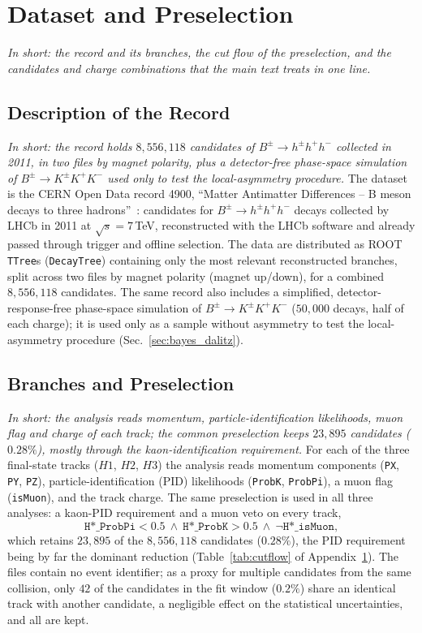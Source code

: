 \appendix
\makeatletter{}\makeatother
\makeatletter\renewcommand{}\makeatother
\section{Dataset and Preselection}
\label{app:ext_data}
\emph{In short: the record and its branches, the cut flow of the preselection, and the candidates and charge combinations that the main text treats in one line.}

\subsection{Description of the Record}
\emph{In short: the record holds $8{,}556{,}118$ candidates of $B^\pm\to h^\pm h^+h^-$ collected in 2011, in two files by magnet polarity, plus a detector-free phase-space simulation of $B^\pm\to K^\pm K^+K^-$ used only to test the local-asymmetry procedure.}
The dataset is the CERN Open Data record 4900, ``Matter Antimatter Differences -- B meson decays to three hadrons''~\cite{opendata_record}: candidates for $B^{\pm}\to h^{\pm}h^{+}h^{-}$ decays collected by LHCb in 2011 at $\sqrt{s}=7$\,TeV, reconstructed with the LHCb software and already passed through trigger and offline selection. The data are distributed as ROOT \texttt{TTree}s (\texttt{DecayTree}) containing only the most relevant reconstructed branches, split across two files by magnet polarity (magnet up/down), for a combined $8{,}556{,}118$ candidates. The same record also includes a simplified, detector-response-free phase-space simulation of $B^{\pm}\to K^{\pm}K^{+}K^{-}$ ($50{,}000$ decays, half of each charge); it is used only as a sample without asymmetry to test the local-asymmetry procedure (Sec.~\ref{sec:bayes_dalitz}).

\subsection{Branches and Preselection}
\emph{In short: the analysis reads momentum, particle-identification likelihoods, muon flag and charge of each track; the common preselection keeps $23{,}895$ candidates ($0.28\%$), mostly through the kaon-identification requirement.}
For each of the three final-state tracks ($H1$, $H2$, $H3$) the analysis reads momentum components (\texttt{PX}, \texttt{PY}, \texttt{PZ}), particle-identification (PID) likelihoods (\texttt{ProbK}, \texttt{ProbPi}), a muon flag (\texttt{isMuon}), and the track charge. The same preselection is used in all three analyses: a kaon-PID requirement and a muon veto on every track,
\[
\texttt{H*\_ProbPi} < 0.5 \ \wedge\ \texttt{H*\_ProbK} > 0.5 \ \wedge\ \lnot\texttt{H*\_isMuon},
\]
which retains $23{,}895$ of the $8{,}556{,}118$ candidates ($0.28\%$), the PID requirement being by far the dominant reduction (Table~\ref{tab:cutflow} of Appendix~\ref{app:ext_data}). The files contain no event identifier; as a proxy for multiple candidates from the same collision, only $42$ of the candidates in the fit window ($0.2\%$) share an identical track with another candidate, a negligible effect on the statistical uncertainties, and all are kept.

